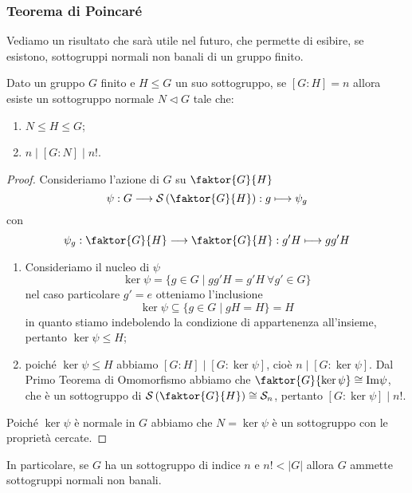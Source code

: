 \documentclass[11pt]{scrartcl}
\begin{document}
	\subsubsection{Teorema di Poincaré}
	
	Vediamo un risultato che sarà utile nel futuro, che permette di esibire,
	se esistono, sottogruppi normali non banali di un gruppo finito.
	
	\begin{theorem}
		\label{teorema1.50}
		Dato un gruppo $G$ finito e $H\leqslant G$ un suo sottogruppo, 
		se $[G:H] = n$ allora esiste un sottogruppo normale $N\triangleleft G$ 
		tale che:
		\begin{enumerate}[(1)]
			\item $N\leqslant H \leqslant G$;
			\item $n \mid [G:N] \mid n!$.
		\end{enumerate}
	\end{theorem}
	
	\begin{proof}
		Consideriamo l'azione di $G$ su $\faktor{G}{H}$
		\[
		\psi: G\longrightarrow\mathcal{S}\left(\faktor{G}{H}\right):g\longmapsto \psi_g
		\]
		con
		\[
		\psi_g:\faktor{G}{H}\longrightarrow\faktor{G}{H} : g'H\longmapsto gg'H
		\]
		\begin{enumerate}[(1)]
			\item Consideriamo il nucleo di $\psi$
			\[
			\ker\psi = \{g \in G\mid gg'H = g'H~\forall g' \in G\}
			\]
			nel caso particolare $g' = e$ otteniamo l'inclusione
			\[
			\ker\psi \subseteq \{g \in G \mid gH = H\} = H
			\]
			in quanto stiamo indebolendo la condizione di appartenenza all'insieme,
			pertanto $\ker\psi \leqslant H$;
			\item poiché $\ker\psi \leqslant H$ abbiamo $[G:H]\mid [G:\ker\psi]$, cioè
			$n \mid [G:\ker\psi]$. Dal Primo Teorema di Omomorfismo abbiamo che
			$\faktor{G}{\ker\psi} \cong \mathrm{Im\psi}$, che è un sottogruppo
			di $\mathcal{S}\left(\faktor{G}{H}\right)\cong \mathcal{S}_n$, pertanto $[G:\ker\psi]\mid n!$.
		\end{enumerate}
		Poiché $\ker\psi$ è normale in $G$ abbiamo che $N = \ker\psi$ è un sottogruppo
		con le proprietà cercate.
	\end{proof}
	
	\begin{remark}
		In particolare, se $G$ ha un sottogruppo di indice $n$ e $n! < |G|$
		allora $G$ ammette sottogruppi normali non banali.
	\end{remark}
	
\end{document}
